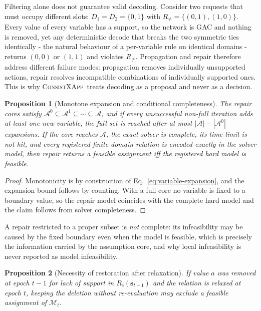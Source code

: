 \documentclass[pdflatex,sn-mathphys-num,iicol,oneside]{sn-jnl}
\newcommand{\method}{\textsc{ConsistXApp}}
\newtheorem{proposition}{Proposition}
\begin{document}
Filtering alone does not guarantee valid decoding. Consider two
requests that must occupy different slots:
$D_1=D_2=\{0,1\}$ with $R_{\neq}=\{(0,1),(1,0)\}$. Every value of
every variable has a support, so the network is GAC and nothing is
removed, yet any deterministic decode that breaks the two symmetric
ties identically - the natural behaviour of a per-variable rule on
identical domains - returns $(0,0)$ or $(1,1)$ and violates
$R_{\neq}$. Propagation and repair therefore address different
failure modes: propagation removes individually unsupported actions,
repair resolves incompatible combinations of individually supported
ones. This is why \method\ treats decoding as a proposal and never as
a decision.

\begin{proposition}[Monotone expansion and conditional completeness]
\label{prop:completeness}
The repair cores satisfy
$\mathcal{A}^{0}\subseteq\mathcal{A}^{1}\subseteq\cdots\subseteq
\mathcal{A}$, and if every unsuccessful non-full iteration adds at
least one new variable, the full set is reached after at most
$|\mathcal{A}|-|\mathcal{A}^{0}|$ expansions. If the core reaches
$\mathcal{A}$, the exact solver is complete, its time limit is not
hit, and every registered finite-domain relation is encoded exactly in
the solver model, then repair returns a feasible assignment iff the
registered hard model is feasible.
\end{proposition}

\begin{proof}
Monotonicity is by construction of
Eq.~\eqref{eq:variable-expansion}, and the expansion bound follows by
counting. With a full core no variable is fixed to a boundary value,
so the repair model coincides with the complete hard model and the
claim follows from solver completeness.
\end{proof}

A repair restricted to a proper subset is \emph{not} complete: its
infeasibility may be caused by the fixed boundary even when the model
is feasible, which is precisely the information carried by the
assumption core, and why local infeasibility is never reported as
model infeasibility.

\begin{proposition}[Necessity of restoration after relaxation]
\label{prop:restoration}
If value $a$ was removed at epoch $t-1$ for lack of support in
$R_c(\bm{s}_{t-1})$ and the relation is relaxed at epoch $t$, keeping
the deletion without re-evaluation may exclude a feasible assignment
of $\mathcal{M}_t$.
\end{proposition}
\end{document}
